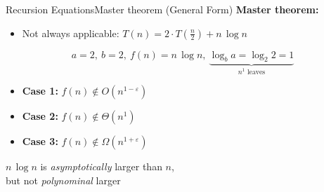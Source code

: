 \begin{frame}{Recursion Equations}{Master theorem (General Form)}
  \textbf{Master theorem:}
  \begin{itemize}
    \item<2->
      Not always applicable:
      {\color{Mittel-Blau}$T(n) = 2 \cdot T(\frac{n}{2}) + n \, \log n$}
  \end{itemize}
  \vspace{1.0em}
  \begin{displaymath}
    a = 2, ~ b = 2, ~ f(n) = n \, \log n, ~
    \underbrace{\log_b a = \log_2 2 = 1}_{\text{$n^1$ leaves}}
  \end{displaymath}
  \begin{itemize}
    \item<4->
      \textbf{Case 1:}
      $f(n) \notin O(n^{1-\varepsilon})$
    \item<5->
      \textbf{Case 2:}
      $f(n) \notin \Theta(n^1)$
    \item<6->
      \textbf{Case 3:}
      $f(n) \notin \Omega(n^{1+\varepsilon})$
  \end{itemize}
  \begin{center}
    {\color{Mittel-Blau}$n \, \log n$} is \textit{asymptotically} larger than
    {\color{Mittel-Blau}$n$},\\ but not \textit{polynominal} larger
  \end{center}
\end{frame}


